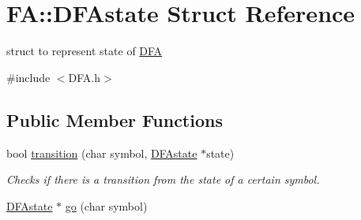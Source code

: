 \hypertarget{structFA_1_1DFAstate}{\section{F\-A\-:\-:D\-F\-Astate Struct Reference}
\label{structFA_1_1DFAstate}
}


struct to represent state of \hyperlink{classFA_1_1DFA}{D\-F\-A}  




{\ttfamily \#include $<$D\-F\-A.\-h$>$}

\subsection*{Public Member Functions}
\begin{DoxyCompactItemize}
\item 
bool \hyperlink{structFA_1_1DFAstate_a5c5ff1b409dc6868b862b027f9259826}{transition} (char symbol, \hyperlink{structFA_1_1DFAstate}{D\-F\-Astate} $\ast$state)
\begin{DoxyCompactList}\small\item\em Checks if there is a transition from the state of a certain symbol. \end{DoxyCompactList}\item 
\hypertarget{structFA_1_1DFAstate_a58f887da9b98411f3f446113ad5ff7a2}{\hyperlink{structFA_1_1DFAstate}{D\-F\-Astate} $\ast$ \hyperlink{structFA_1_1DFAstate_a58f887da9b98411f3f446113ad5ff7a2}{go} (char symbol)}\label{structFA_1_1DFAstate_a58f887da9b98411f3f446113ad5ff7a2}


\end{DoxyCompactItemize}
